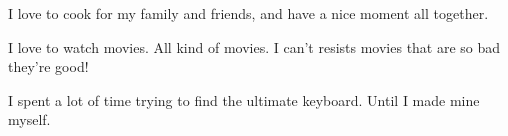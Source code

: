 \begin{rubric}{%
}
\entry*[Cooking] I love to cook for my family and friends, and have a nice moment all together.


\entry*[Movies] I love to watch movies. All kind of movies. I can't resists movies that are so bad they're good!

 I spent a lot of time trying to find the ultimate keyboard. Until I made mine myself.

\end{rubric}


